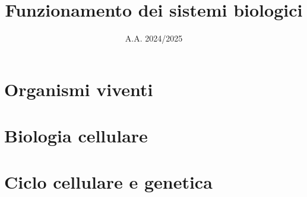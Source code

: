 \documentclass[11pt, oneside, openany]{book}
\title{Funzionamento dei sistemi biologici}
\author{}
\date{A.A. 2024/2025}
\begin{document}
\frontmatter                 %

\maketitle
\thispagestyle{empty}
\clearpage

\tableofcontents
\clearpage

\mainmatter                  %

\chapter{Organismi viventi}






\chapter{Biologia cellulare}







\chapter{Ciclo cellulare e genetica}





\end{document}
